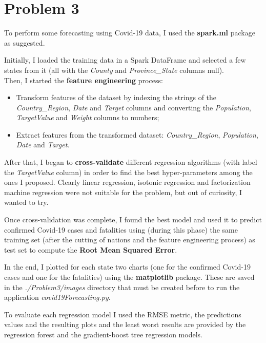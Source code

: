\documentclass[11pt]{article}
\begin{document}
\newpage
\section{Problem 3}
To perform some forecasting using Covid-19 data, I used the \textbf{spark.ml} package as suggested.

\bigskip
Initially, I loaded the training data in a Spark DataFrame and selected a few states from it
(all with the \textit{County} and \textit{Province\_State} columns null). \\

Then, I started the \textbf{feature engineering} process:
\begin{itemize}
 \item Transform features of the dataset by indexing the strings of the \textit{Country\_Region}, \textit{Date} and \textit{Target}
  columns and converting the \textit{Population}, \textit{TargetValue} and \textit{Weight} columns to numbers;
 \item Extract features from the transformed dataset: \textit{Country\_Region}, \textit{Population}, \textit{Date} and
  \textit{Target}.
\end{itemize}

After that, I began to \textbf{cross-validate} different regression algorithms (with label the \textit{TargetValue} column) in order to find the best hyper-parameters among the ones I proposed.
Clearly linear regression, isotonic regression and factorization machine regression were not suitable for the problem,
but out of curiosity, I wanted to try.

\bigskip
Once cross-validation was complete, I found the best model and used it to predict confirmed Covid-19 cases and fatalities using
(during this phase) the same training set (after the cutting of nations and the feature engineering process) as test set to compute the \textbf{Root Mean Squared Error}.

\bigskip
In the end, I plotted for each state two charts (one for the confirmed Covid-19 cases and one for the fatalities) using the \textbf{matplotlib} package. These are saved in the \textit{./Problem3/images} directory that must be created before to run the
application \textit{covid19Forecasting.py}.

\bigskip
To evaluate each regression model I used the RMSE metric, the predictions values and the resulting plots and the least worst
results are provided by the regression forest and the gradient-boost tree regression models.
\end{document}
